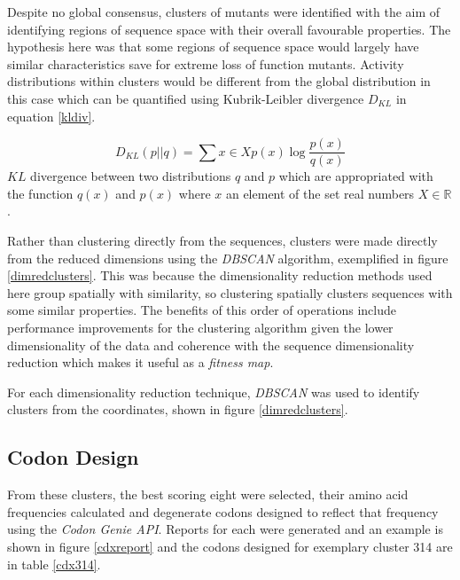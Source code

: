 \documentclass[16pt]{book}
\begin{document}
Despite no global consensus, clusters of mutants were identified with the aim of identifying regions of sequence space with their overall favourable properties.
The hypothesis here was that some regions of sequence space would largely have similar characteristics save for extreme loss of function mutants.
Activity distributions within clusters would be different from the global distribution in this case which can be quantified using Kubrik-Leibler divergence \cite{kldiver} $D_{KL}$ in equation \ref{kldiv}.

\begin{equation}\label{kldiv}
	D_{KL}(p||q) = \sum{x \in X} p(x) \log{\frac{p(x)}{q(x)}}
\end{equation}
$KL$ divergence between two distributions $q$ and $p$ which are appropriated with the function $q(x)$ and $p(x)$ where $x$ an element of the set real numbers $X \in \mathbb{R}$.

Rather than clustering directly from the sequences, clusters were made directly from the reduced dimensions using the \textit{DBSCAN} algorithm, exemplified in figure \ref{dimredclusters}.
This was because the dimensionality reduction methods used here group spatially with similarity, so clustering spatially clusters sequences with some similar properties.
The benefits of this order of operations include performance improvements for the clustering algorithm given the lower dimensionality of the data and coherence with the sequence dimensionality reduction which makes it useful as a \textit{fitness map}.

For each dimensionality reduction technique, \textit{DBSCAN} was used to identify clusters from the coordinates, shown in figure \ref{dimredclusters}.


\subsection{Codon Design}
From these clusters, the best scoring eight were selected, their amino acid frequencies calculated and degenerate codons designed to reflect that frequency using the \textit{Codon Genie API}.
Reports for each were generated and an example is shown in figure \ref{cdxreport} and the codons designed for exemplary cluster 314 are in table \ref{cdx314}.
\end{document}

